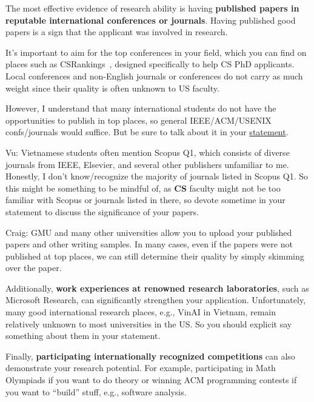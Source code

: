\documentclass[11pt]{article}
\begin{document}
The most effective evidence of research ability is having \textbf{published papers in reputable international conferences or journals}.
Having published good papers is a sign that the applicant was involved in research.

It's important to aim for the top conferences in your field, which you can
find on places such as CSRankings~\cite{csrankings}, designed specifically to help CS PhD
applicants. Local conferences and non-English journals or conferences do
not carry as much weight since their quality is often unknown to US
faculty.

However, I understand that many international students do not have the opportunities to publish in top places, so general IEEE/ACM/USENIX confs/journals would suffice.  But be sure to talk about it in your \hyperref[sec:research-statement]{statement}.

\begin{tcolorbox}[left=1pt,right=1pt,top=1pt,bottom=1pt]
Vu: Vietnamese students often mention Scopus Q1, which consists of diverse journals from IEEE, Elsevier, and several other publishers unfamiliar to me.  Honestly, I don't know/recognize the majority of journals listed in Scopus Q1. So this might be something to be mindful of, as \textbf{CS} faculty might not be too familiar with Scopus or journals listed in there, so devote sometime in your statement to discuss the significance of your papers.
\end{tcolorbox}

\begin{tcolorbox}[left=1pt,right=1pt,top=1pt,bottom=1pt]
Craig: GMU and many other universities allow you to upload your published papers and other writing samples. In many cases, even if the papers were not published at top places, we can still determine their quality by simply skimming over the paper.  
\end{tcolorbox}

Additionally, \textbf{work experiences at renowned research laboratories}, such as Microsoft Research, can significantly strengthen your
application.  Unfortunately, many good international research places, e.g., VinAI in Vietnam, remain relatively unknown to most universities in the US. So you should explicit say something about them in your statement.

Finally, \textbf{participating internationally recognized competitions} can also demonstrate your research potential.
For example, participating in Math Olympiads if you want to do theory or  winning ACM programming contests if you want to ``build'' stuff, e.g., software analysis.
\end{document}
